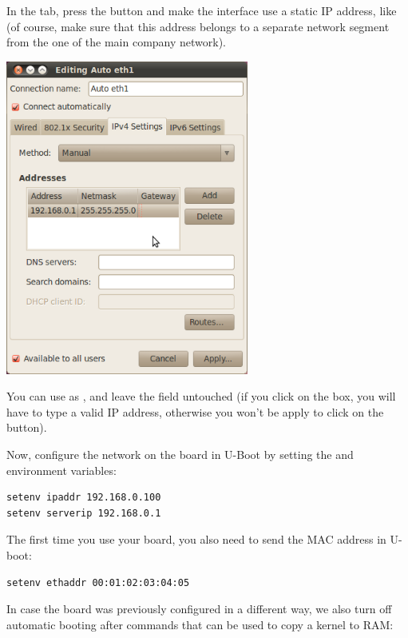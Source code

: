 In the  tab, press the  button
and make the interface use a static IP
address, like  (of course, make sure that this
address belongs to a separate network segment from the one of the main
company network).

\begin{center}
\includegraphics[width=8cm]{labs/sysdev-u-boot/network-config-3.png}
\end{center}

You can use  as , and leave the
 field untouched (if you click on the  box, you
will have to type a valid IP address, otherwise you won't be apply to
click on the  button).

Now, configure the network on the board in U-Boot by setting the 
and  environment variables:

\begin{verbatim}
setenv ipaddr 192.168.0.100
setenv serverip 192.168.0.1
\end{verbatim}

The first time you use your board, you also need to send the MAC address
in U-boot:

\begin{verbatim}
setenv ethaddr 00:01:02:03:04:05
\end{verbatim}

In case the board was previously configured in a different way, we
also turn off automatic booting after commands that can be used to
copy a kernel to RAM:

